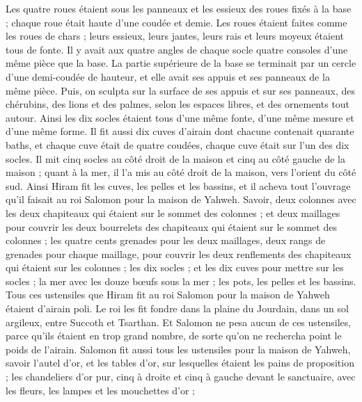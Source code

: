 \begin{multicols}{2}
Les quatre roues étaient sous les panneaux et les essieux des roues fixés à la base ; chaque roue était haute d'une coudée et demie.
Les roues étaient faites comme les roues de chars ; leurs essieux, leurs jantes, leurs rais et leurs moyeux étaient tous de fonte.
Il y avait aux quatre angles de chaque socle quatre consoles d'une même pièce que la base.
La partie supérieure de la base se terminait par un cercle d'une demi-coudée de hauteur, et elle avait ses appuis et ses panneaux de la même pièce.
Puis, on sculpta sur la surface de ses appuis et sur ses panneaux, des chérubins, des lions et des palmes, selon les espaces libres, et des ornements tout autour.
Ainsi les dix socles étaient tous d'une même fonte, d'une même mesure et d'une même forme.
Il fit aussi dix cuves d'airain dont chacune contenait quarante baths, et chaque cuve était de quatre coudées, chaque cuve était sur l'un des dix socles.
Il mit cinq socles au côté droit de la maison et cinq au côté gauche de la maison ; quant à la mer, il l'a mis au côté droit de la maison, vers l'orient du côté sud.
Ainsi Hiram fit les cuves, les pelles et les bassins, et il acheva tout l'ouvrage qu'il faisait au roi Salomon pour la maison de Yahweh.
Savoir, deux colonnes avec les deux chapiteaux qui étaient sur le sommet des colonnes ; et deux maillages pour couvrir les deux bourrelets des chapiteaux qui étaient sur le sommet des colonnes ;
les quatre cents grenades pour les deux maillages, deux rangs de grenades pour chaque maillage, pour couvrir les deux renflements des chapiteaux qui étaient sur les colonnes ;
les dix socles ; et les dix cuves pour mettre sur les socles ;
la mer avec les douze bœufs sous la mer ;
les pots, les pelles et les bassins. Tous ces ustensiles que Hiram fit au roi Salomon pour la maison de Yahweh étaient d'airain poli.
Le roi les fit fondre dans la plaine du Jourdain, dans un sol argileux, entre Succoth et Tsarthan.
Et Salomon ne pesa aucun de ces ustensiles, parce qu'ils étaient en trop grand nombre, de sorte qu'on ne rechercha point le poids de l'airain.
Salomon fit aussi tous les ustensiles pour la maison de Yahweh, savoir l'autel d'or, et les tables d'or, sur lesquelles étaient les pains de proposition ;
les chandeliers d'or pur, cinq à droite et cinq à gauche devant le sanctuaire, avec les fleurs, les lampes et les mouchettes d'or ;

\end{multicols}
